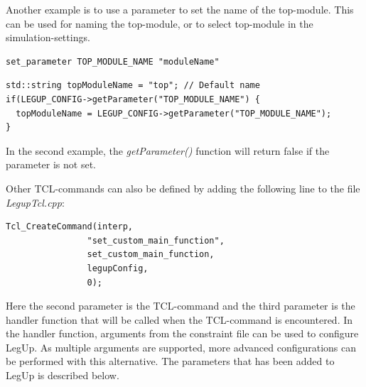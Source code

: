 Another example is to use a parameter to set the name of the top-module. This can be used for naming the top-module, or to select top-module in the simulation-settings. 
\begin{verbatim}
set_parameter TOP_MODULE_NAME "moduleName"
\end{verbatim}
\begin{lstlisting}
std::string topModuleName = "top"; // Default name
if(LEGUP_CONFIG->getParameter("TOP_MODULE_NAME") {
  topModuleName = LEGUP_CONFIG->getParameter("TOP_MODULE_NAME");
}
\end{lstlisting}
In the second example, the \textit{getParameter()} function will return false if the parameter is not set.

Other TCL-commands can also be defined by adding the following line to the file \textit{LegupTcl.cpp}:
\begin{lstlisting}
Tcl_CreateCommand(interp,
                "set_custom_main_function",
                set_custom_main_function,
                legupConfig,
                0);
\end{lstlisting}
Here the second parameter is the TCL-command and the third parameter is the handler function that will be called when the TCL-command is encountered. In the handler function, arguments from the constraint file can be used to configure LegUp. As multiple arguments are supported, more advanced configurations can be performed with this alternative. The parameters that has been added to LegUp is described below.


